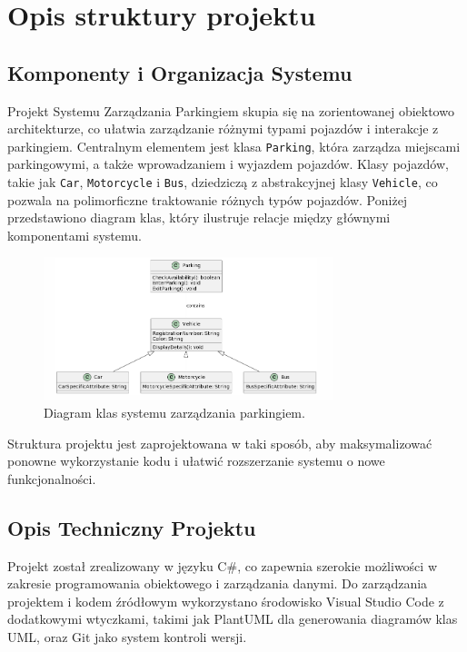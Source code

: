 \chapter{Opis struktury projektu}

\section{Komponenty i Organizacja Systemu}
Projekt Systemu Zarządzania Parkingiem skupia się na zorientowanej obiektowo architekturze, co ułatwia zarządzanie różnymi typami pojazdów i interakcje z parkingiem. Centralnym elementem jest klasa \texttt{Parking}, która zarządza miejscami parkingowymi, a także wprowadzaniem i wyjazdem pojazdów. Klasy pojazdów, takie jak \texttt{Car}, \texttt{Motorcycle} i \texttt{Bus}, dziedziczą z abstrakcyjnej klasy \texttt{Vehicle}, co pozwala na polimorficzne traktowanie różnych typów pojazdów. Poniżej przedstawiono diagram klas, który ilustruje relacje między głównymi komponentami systemu.

\begin{figure}[H]
\centering
\includegraphics[width=0.75\textwidth]{photos/diagram.png}
\caption{Diagram klas systemu zarządzania parkingiem.}
\end{figure}

Struktura projektu jest zaprojektowana w taki sposób, aby maksymalizować ponowne wykorzystanie kodu i ułatwić rozszerzanie systemu o nowe funkcjonalności.
\clearpage
\section{Opis Techniczny Projektu}

Projekt został zrealizowany w języku C\#, co zapewnia szerokie możliwości w zakresie programowania obiektowego i zarządzania danymi. Do zarządzania projektem i kodem źródłowym wykorzystano środowisko Visual Studio Code z dodatkowymi wtyczkami, takimi jak PlantUML dla generowania diagramów klas UML, oraz Git jako system kontroli wersji.

